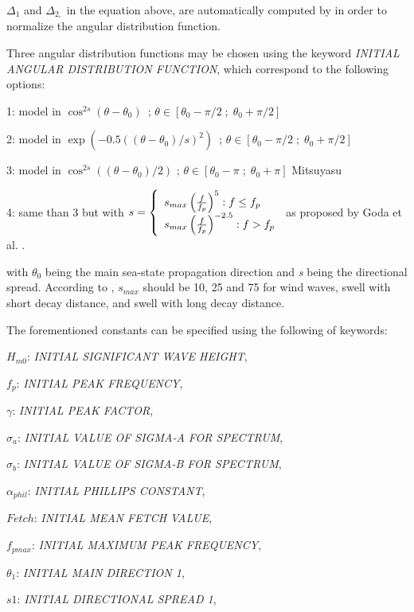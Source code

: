  $\Delta_{1}$ and $\Delta_{2,}$ in the equation above, are automatically computed by \tomawac in order to normalize the angular distribution function.

 Three angular distribution functions may be chosen using the keyword \textit{INITIAL ANGULAR DISTRIBUTION FUNCTION}, which correspond to the following options:

 1: model in $\cos ^{2s} (\theta -\theta _{0} )$~; $\theta \in \left[\theta _{0} -\pi /2\; ;\; \theta _{0} +\pi /2\right]$

 2: model in $\exp \left(-0.5\left(\left(\theta -\theta _{0} \right)/s\right)^{2} \right)$~; $\theta \in \left[\theta _{0} -\pi /2\; ;\; \theta _{0} +\pi /2\right]$

 3: model in $\cos ^{2s} \left(\left(\theta -\theta _{0} \right)/2\right)$ ; $\theta \in \left[\theta _{0} -\pi \; ;\; \theta _{0} +\pi \right]$ Mitsuyasu \cite{Mitsuyasu1975}

 4: same than 3 but with
 $ s=\left\{ \barr{l} s_{max} \left(\frac{f}{f_p} \right)^5 : f\le f_p \\
 s_{max} \left(\frac{f}{f_p} \right)^{-2.5} : f > f_p \earr\right. $ as proposed by Goda et al. \cite{Goda1975}. 
 
 with $\theta_{0}$ being the main sea-state propagation direction and \textit{s} being the directional spread. According to \cite{Goda1975}, $s_{max}$ should be 10, 25 and 75 for wind waves, swell with short decay distance, and swell with long decay distance.

 The forementioned constants can be specified using the following of keywords:

 $H_{m0}$: \textit{INITIAL SIGNIFICANT WAVE HEIGHT},

 $f_p$:  \textit{INITIAL PEAK FREQUENCY},

 $\gamma$:  \textit{INITIAL PEAK FACTOR},

 $\sigma_a$:  \textit{INITIAL VALUE OF SIGMA-A FOR SPECTRUM},

 $\sigma_b$:  \textit{INITIAL VALUE OF SIGMA-B FOR SPECTRUM},

 $\alpha_{phil}$:  \textit{INITIAL PHILLIPS CONSTANT},

 $Fetch$:  \textit{INITIAL MEAN FETCH VALUE},

 $f_{pmax}$:  \textit{INITIAL MAXIMUM PEAK FREQUENCY},

 $\theta_1$:  \textit{INITIAL MAIN DIRECTION 1},

 $s1$:  \textit{INITIAL DIRECTIONAL SPREAD 1},

